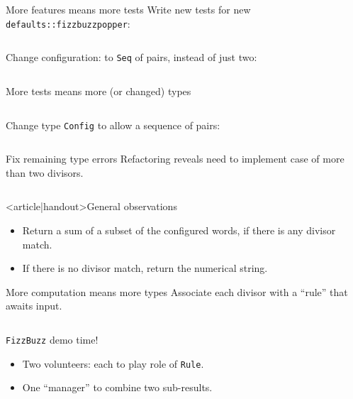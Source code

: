 \begin{frame}[fragile]{More features means more tests}
  Write new tests for new \texttt{defaults::fizzbuzzpopper}:

  \inputminted[gobble=2]{rust}{FizzBuzzSpec5.rs}

  Change configuration: to \texttt{Seq} of pairs, instead of just two:
  \inputminted{rust}{Defaults2.rs}
\end{frame}

\begin{frame}[fragile]{More tests means more (or changed) types}
  \inputminted{console}{testQuick8.console}

  Change \alert{type} \texttt{Config} to allow a sequence of pairs:

  \inputminted{rust}{FizzBuzz3Seq.rs}

\end{frame}

\begin{frame}[fragile]{Fix remaining type errors}
  Refactoring reveals need to implement case of more than two divisors.

  \inputminted{rust}{FizzBuzz3SeqCompile.rs}
\end{frame}

\begin{frame}<article|handout>{General observations}
  \begin{itemize}
  \item Return a sum of a subset of the configured words, if there is any divisor match.
  \item If there is \alert{no} divisor match, return the numerical string.
  \end{itemize}
\end{frame}

\begin{frame}[fragile]{More computation means more types}
  Associate each divisor with a ``rule'' that awaits input.

  \inputminted{rust}{FizzBuzz4.rs}

  \begin{block}{\texttt{FizzBuzz} demo time!}
    \begin{itemize}
    \item Two volunteers: each to play role of \texttt{Rule}.
    \item One ``manager'' to combine two sub-results.
    \end{itemize}
  \end{block}
\end{frame}

